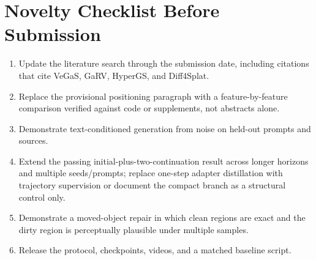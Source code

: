 \documentclass[10pt]{article}
\begin{document}
\section{Novelty Checklist Before Submission}

\begin{enumerate}
  \item Update the literature search through the submission date, including citations that cite
  VeGaS, GaRV, HyperGS, and Diff4Splat.
  \item Replace the provisional positioning paragraph with a feature-by-feature comparison verified
  against code or supplements, not abstracts alone.
  \item Demonstrate text-conditioned generation from noise on held-out prompts and sources.
  \item Extend the passing initial-plus-two-continuation result across longer horizons and multiple
  seeds/prompts; replace one-step adapter distillation with trajectory supervision or document the
  compact branch as a structural control only.
  \item Demonstrate a moved-object repair in which clean regions are exact and the dirty region is
  perceptually plausible under multiple samples.
  \item Release the protocol, checkpoints, videos, and a matched baseline script.
\end{enumerate}

\clearpage


\end{document}
